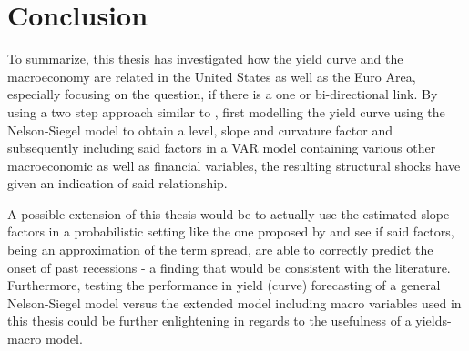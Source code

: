 \section{Conclusion}
\label{sec:conclusion}
To summarize, this thesis has investigated how the yield curve and the macroeconomy are related in the United States as well as the Euro Area, especially focusing on the question, if there is a one or bi-directional link. 
By using a two step approach similar to \citet{diebold2006macroeconomy}, first modelling the yield curve using the Nelson-Siegel model to obtain a level, slope and curvature factor and subsequently including said factors in a VAR model containing various other macroeconomic as well as financial variables, the resulting structural shocks have given an indication of said relationship.

A possible extension of this thesis would be to actually use the estimated slope factors in a probabilistic setting like the one proposed by \citet{estrella1991term} and see if said factors, being an approximation of the term spread, are able to correctly predict the onset of past recessions - a finding that would be consistent with the literature.  
Furthermore, testing the performance in yield (curve) forecasting of a general Nelson-Siegel model versus the extended model including macro variables used in this thesis could be further enlightening in regards to the usefulness of a yields-macro model.

